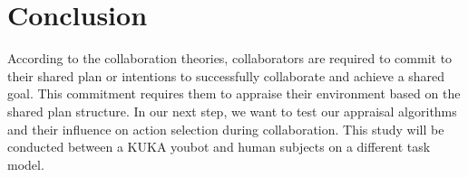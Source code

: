 \documentclass{aamas2016_extendedabstract}
\begin{document}
\vspace{-3mm}
\section{Conclusion}
According to the collaboration theories, collaborators are required to commit to
their shared plan or intentions to successfully collaborate and achieve a shared
goal. This commitment requires them to appraise their environment based on the
shared plan structure. In our next step, we want to test our appraisal
algorithms and their influence on action selection during collaboration. This
study will be conducted between a KUKA youbot and human subjects on a different
task model.

% 

\vspace{-3mm}


\end{document}
